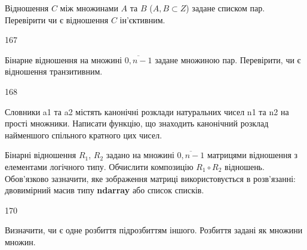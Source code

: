 Відношення $C$ між множинами $A$ та $B$ ($A, B\subset Z$) задане списком пар. Перевірити чи є відношення $C$ ін'єктивним.
\\\par
167 














Бінарне відношення на множині $\overline{0,n-1}$ задане множиною пар. Перевірити, чи є відношення транзитивним.
\\\par
168 














Словники a1 та a2 містять канонічні розклади натуральних чисел n1 та n2 на прості множники. Написати функцію, що знаходить канонічний розклад найменшого спільного кратного цих чисел.
\\\par
{} 














Бінарні відношення $R_1$, $R_2$ задано на множині $\overline{0,n-1}$ матрицями відношення з елементами логічного типу. Обчислити композицію $R_1\circ R_2$ відношень. Обов'язково зазначити, яке зображення матриці використовується в розв'язанні: двовимірний масив типу \textbf{ndarray} або список списків.
\\\par
170 














Визначити, чи є одне розбиття підрозбиттям іншого. Розбиття задані як множини множин.
\\\par
